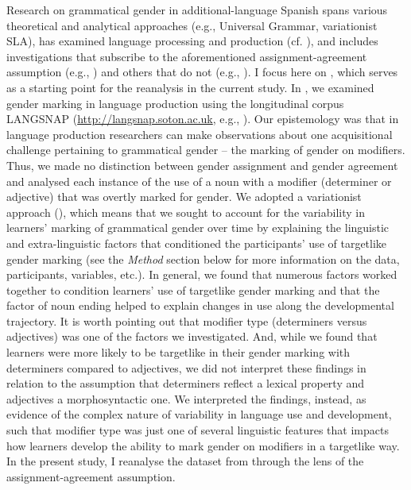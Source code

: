 \documentclass[output=paper,colorlinks,citecolor=brown,modfonts,nonflat]{../langscibook}
\begin{document}
Research on grammatical gender in additional-language Spanish spans various theoretical and analytical approaches (e.g., Universal Grammar, variationist SLA), has examined language processing and production (cf. \citealt{Alarcón2014}), and includes investigations that subscribe to the aforementioned assignment-agreement assumption (e.g., \citealt{Alarcón2010,KupischEtAl2013}) and others that do not (e.g., \citealt{MontrulEtAl2008,GrüterEtAl2012,GudmestadEtAl2019}). I focus here on \citeauthor{GudmestadEtAl2019}, which serves as a starting point for the reanalysis in the current study. In \citeauthor{GudmestadEtAl2019}, we examined gender marking in language production using the longitudinal corpus LANGSNAP (\url{http://langsnap.soton.ac.uk}, e.g., \citealt{MitchellEtAl2017}). Our epistemology was that in language production researchers can make observations about one acquisitional challenge pertaining to grammatical gender – the marking of gender on modifiers. Thus, we made no distinction between gender assignment and gender agreement and analysed each instance of the use of a noun with a modifier (determiner or adjective) that was overtly marked for gender. We adopted a variationist approach (\citealt{GeeslinLong2014}), which means that we sought to account for the variability in learners’ marking of grammatical gender over time by explaining the linguistic and extra-linguistic factors that conditioned the participants’ use of targetlike gender marking (see the \textit{Method} section below for more information on the data, participants, variables, etc.). In general, we found that numerous factors worked together to condition learners’ use of targetlike gender marking and that the factor of noun ending helped to explain changes in use along the developmental trajectory. It is worth pointing out that modifier type (determiners versus adjectives) was one of the factors we investigated. And, while we found that learners were more likely to be targetlike in their gender marking with determiners compared to adjectives, we did not interpret these findings in relation to the assumption that determiners reflect a lexical property and adjectives a morphosyntactic one. We interpreted the findings, instead, as evidence of the complex nature of variability in language use and development, such that modifier type was just one of several linguistic features that impacts how learners develop the ability to mark gender on modifiers in a targetlike way. In the present study, I reanalyse the dataset from \citeauthor{GudmestadEtAl2019} through the lens of the assignment-agreement assumption.
\end{document}
